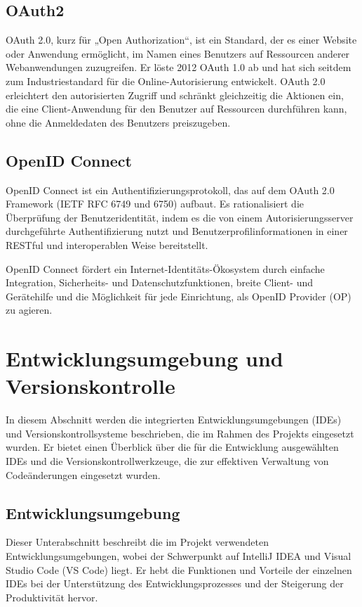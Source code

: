 \subsection{OAuth2}
OAuth 2.0, kurz für „Open Authorization“, ist ein Standard, der es einer Website oder Anwendung ermöglicht, im Namen eines Benutzers auf Ressourcen anderer Webanwendungen zuzugreifen. Er löste 2012 OAuth 1.0 ab und hat sich seitdem zum Industriestandard für die Online-Autorisierung entwickelt. OAuth 2.0 erleichtert den autorisierten Zugriff und schränkt gleichzeitig die Aktionen ein, die eine Client-Anwendung für den Benutzer auf Ressourcen durchführen kann, ohne die Anmeldedaten des Benutzers preiszugeben\cite{OAuth2:o.J}.

\subsection{OpenID Connect}
OpenID Connect ist ein Authentifizierungsprotokoll, das auf dem OAuth 2.0 Framework (IETF RFC 6749 und 6750) aufbaut. Es rationalisiert die Überprüfung der Benutzeridentität, indem es die von einem Autorisierungsserver durchgeführte Authentifizierung nutzt und Benutzerprofilinformationen in einer RESTful und interoperablen Weise bereitstellt.

OpenID Connect fördert ein Internet-Identitäts-Ökosystem durch einfache Integration, Sicherheits- und Datenschutzfunktionen, breite Client- und Gerätehilfe und die Möglichkeit für jede Einrichtung, als OpenID Provider (OP) zu agieren\cite{OpenId:o.J}.


\section{Entwicklungsumgebung und Versionskontrolle}
In diesem Abschnitt werden die integrierten Entwicklungsumgebungen (IDEs) und Versionskontrollsysteme beschrieben, die im Rahmen des Projekts eingesetzt wurden. Er bietet einen Überblick über die für die Entwicklung ausgewählten IDEs und die Versionskontrollwerkzeuge, die zur effektiven Verwaltung von Codeänderungen eingesetzt wurden.
\subsection{Entwicklungsumgebung}
Dieser Unterabschnitt beschreibt die im Projekt verwendeten Entwicklungsumgebungen, wobei der Schwerpunkt auf IntelliJ IDEA und Visual Studio Code (VS Code) liegt. Er hebt die Funktionen und Vorteile der einzelnen IDEs bei der Unterstützung des Entwicklungsprozesses und der Steigerung der Produktivität hervor.

